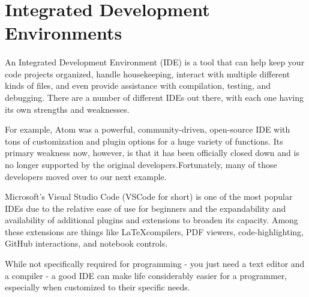 \section{Integrated Development Environments}
\paragraph{}
An Integrated Development Environment (IDE) is a tool that can help keep your code projects organized, handle housekeeping, interact with multiple different kinds of files, and even provide assistance with compilation, testing, and debugging.
There are a number of different IDEs out there, with each one having its own strengths and weaknesses.

For example, Atom was a powerful, community-driven, open-source IDE with tons of customization and plugin options for a huge variety of functions.
Its primary weakness now, however, is that it has been officially closed down and is no longer supported by the original developers.Fortunately, many of those developers moved over to our next example.

Microsoft's Visual Studio Code (VSCode for short) is one of the most popular IDEs due to the relative ease of use for beginners and the expandability and availability of additional plugins and extensions to broaden its capacity.
Among these extensions are things like \LaTeX compilers, PDF viewers, code-highlighting, GitHub interactions, and notebook controls.

While not specifically required for programming - you just need a text editor and a compiler - a good IDE can make life considerably easier for a programmer, especially when customized to their specific needs.